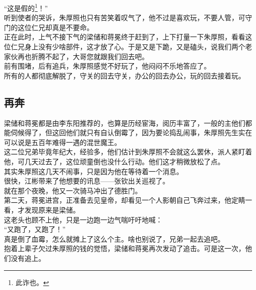 \begin{multicols}{\theparacolNo}
“这是假的\footnote{此诈也。}！”\\

听到使者的哭诉，朱厚照也只有苦笑着叹气了，他不过是喜欢玩，不要人管，可守门的这位仁兄却真是不要命。\\

正在此时，上气不接下气的梁储和蒋冕终于赶到了，上下打量一下朱厚照，看看这位仁兄身上没有少啥部件，这才放了心。于是又是下跪，又是磕头，说我们两个老家伙再也折腾不起了，大哥您就跟我们回去吧。\\

前有围堵，后有追兵，朱厚照感觉不好玩了，他闷闷不乐地答应了。\\

所有的人都彻底解脱了，守关的回去守关，办公的回去办公，玩的回去接着玩。\\

\subsection{再奔}
梁储和蒋冕都是由李东阳推荐的，也算是历经宦海，阅历丰富了，一般的主他们都能伺候得了，但这回他们就只有自认倒霉了，因为要论捣乱闹事，朱厚照先生实在可以说是五百年难得一遇的混世魔王。\\

这二位兄弟毕竟年纪大，经验多，他们估计到朱厚照不会就这么罢休，派人紧盯着他，可几天过去了，这位顽童倒也没什么行动。他们这才稍微放松了点。\\

其实朱厚照这几天不闹事，只是因为他在等待着一个消息。\\

很快，江彬带来了他想要的讯息——张钦出关巡视了。\\

就在那个夜晚，他又一次骑马冲出了德胜门。\\

第二天，蒋冕进宫，正准备去见皇帝，却看见一个人影朝自己飞奔过来，他定睛一看，才发现原来是梁储。\\

这老头也顾不上他，只是一边跑一边气喘吁吁地喊：\\

“又跑了，又跑了！”\\

真是倒了血霉，怎么就摊上了这么个主。啥也别说了，兄弟一起去追吧。\\

抱着上辈子欠过朱厚照的钱的觉悟，梁储和蒋冕再次发动了追击。可是这一次，他们没有追上。\\


\end{multicols}
